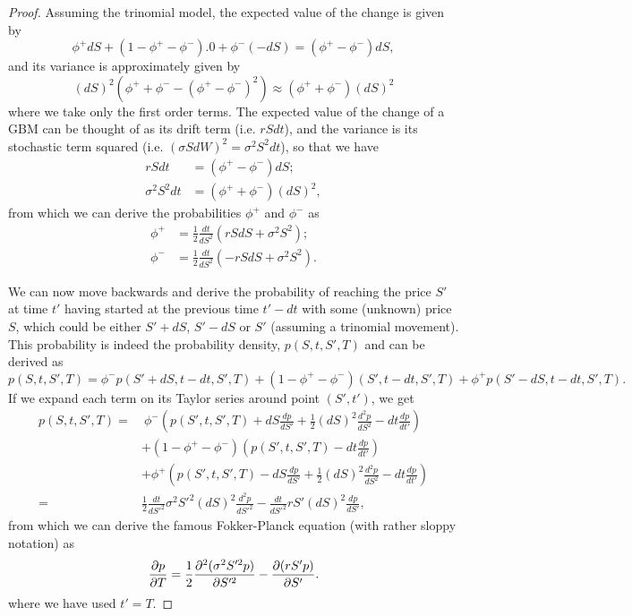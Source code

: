 \begin{proof}
Assuming the trinomial model, the expected value of the change is given by
\begin{equation}
\phi^+dS+(1-\phi^+-\phi^-).0+\phi^-(-dS)=(\phi^+-\phi^-)dS,
\end{equation}
\noindent and its variance is approximately given by
\begin{equation}
(dS)^2(\phi^++\phi^--(\phi^+-\phi^-)^2)\approx (\phi^++\phi^-)(dS)^2
\end{equation}
\noindent where we take only the first order terms. The expected value of the change of a GBM can be thought of as its drift term (i.e. $rSdt$), and the variance is its stochastic term squared (i.e. $(\sigma SdW)^2=\sigma^2S^2dt$), so that we have
\begin{equation}
\begin{split}
rSdt&=(\phi^+-\phi^-)dS;\\
\sigma^2S^2dt&=(\phi^++\phi^-)(dS)^2,
\end{split}
\end{equation}
\noindent from which we can derive the probabilities $\phi^+$ and $\phi^-$ as
\begin{equation}
\begin{split}
\phi^+&=\frac{1}{2}\frac{dt}{dS^2}(rSdS+\sigma^2S^2);\\
\phi^-&=\frac{1}{2}\frac{dt}{dS^2}(-rSdS+\sigma^2S^2).
\end{split}
\end{equation}

We can now move backwards and derive the probability of reaching the price $S'$ at time $t'$ having started at the previous time $t'-dt$ with some (unknown) price $S$, which could be either $S'+dS$, $S'-dS$ or $S'$ (assuming a trinomial movement). This probability is indeed the probability density, $ p(S,t,S',T) $ and can be derived as
\begin{equation}
p(S,t,S',T)=\phi^-p(S'+dS,t-dt,S',T)+(1-\phi^+-\phi^-)(S',t-dt,S',T)+\phi^+p(S'-dS,t-dt,S',T).
\end{equation}
\noindent If we expand each term on its Taylor series around point $(S',t')$, we get
\begin{equation}
\begin{split}
p(S,t,S',T)=&\ \phi^-\left(p(S',t,S',T)+dS\frac{dp}{dS'}+\frac{1}{2}(dS)^2\frac{d^2p}{dS^2}-dt\frac{dp}{dt'}\right)\\
&+(1-\phi^+-\phi^-)\left(p(S',t,S',T)-dt\frac{dp}{dt'}\right)\\
&+\phi^+\left(p(S',t,S',T)-dS\frac{dp}{dS'}+\frac{1}{2}(dS)^2\frac{d^2p}{dS^2}-dt\frac{dp}{dt'}\right)\\
=&\frac{1}{2}\frac{dt}{dS'^2}\sigma^2S'^2(dS)^2\frac{d^2p}{dS'^2}-\frac{dt}{dS'^2}rS'(dS)^2\frac{dp}{dS'},
\end{split}
\end{equation}
\noindent from which we can derive the famous Fokker-Planck equation (with rather sloppy notation) as
\begin{equation}\label{FokkerPlanck}
\pdv{p}{T}=\frac{1}{2}\pdv{^2(\sigma^2S'^2p)}{S'^2}-\pdv{(rS'p)}{S'}.
\end{equation}
\noindent where we have used $t'=T$.



\end{proof}
